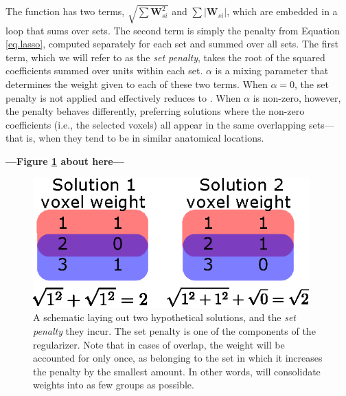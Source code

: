 
The function has two terms, $\sqrt{\sum{\mathbf{W}^2_{si}}}$ and $\sum{|\mathbf{W}_{si}|}$, which are embedded in a loop that sums over sets. The second term is simply the {\lasso} penalty from Equation \ref{eq.lasso}, computed separately for each set and summed over all sets. The first term, which we will refer to as the {\em set penalty}, takes the root of the squared coefficients summed over units within each set. $\alpha$ is a mixing parameter that determines the weight given to each of these two terms. When $\alpha=0$, the set penalty is not applied and {\soslasso} effectively reduces to {\lasso}. When $\alpha$ is non-zero, however, the penalty behaves differently, preferring solutions where the non-zero coefficients (i.e., the selected voxels) all appear in the same overlapping sets---that is, when they tend to be in similar anatomical locations.

\begin{center}
	\textbf{---Figure \ref{fig.soslossex} about here---}
\end{center}

\begin{figure}
	\centering
	\includegraphics[width=0.95\textwidth]{figures/soslasso_loss_example.eps}
	\caption{A schematic laying out two hypothetical solutions, and the {\em set penalty} they incur. The set penalty is one of the components of the {\soslasso} regularizer. Note that in cases of overlap, the weight will be accounted for only once, as belonging to the set in which it increases the penalty by the smallest amount. In other words, {\soslasso} will consolidate weights into as few groups as possible.}
	\label{fig.soslossex} 
\end{figure}

